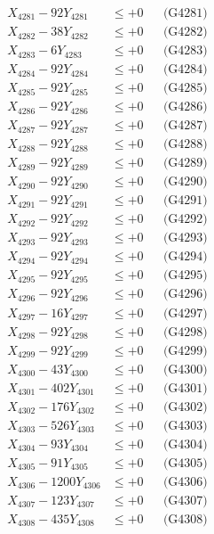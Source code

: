 \documentclass[a4paper,10pt]{article}
\begin{document}
{\begin{align}
X_{4281} - 92Y_{4281} &\leq +0 && \text{(G4281)} \\
X_{4282} - 38Y_{4282} &\leq +0 && \text{(G4282)} \\
X_{4283} - 6Y_{4283} &\leq +0 && \text{(G4283)} \\
X_{4284} - 92Y_{4284} &\leq +0 && \text{(G4284)} \\
X_{4285} - 92Y_{4285} &\leq +0 && \text{(G4285)} \\
X_{4286} - 92Y_{4286} &\leq +0 && \text{(G4286)} \\
X_{4287} - 92Y_{4287} &\leq +0 && \text{(G4287)} \\
X_{4288} - 92Y_{4288} &\leq +0 && \text{(G4288)} \\
X_{4289} - 92Y_{4289} &\leq +0 && \text{(G4289)} \\
X_{4290} - 92Y_{4290} &\leq +0 && \text{(G4290)} \\
\allowbreak
X_{4291} - 92Y_{4291} &\leq +0 && \text{(G4291)} \\
X_{4292} - 92Y_{4292} &\leq +0 && \text{(G4292)} \\
X_{4293} - 92Y_{4293} &\leq +0 && \text{(G4293)} \\
X_{4294} - 92Y_{4294} &\leq +0 && \text{(G4294)} \\
X_{4295} - 92Y_{4295} &\leq +0 && \text{(G4295)} \\
X_{4296} - 92Y_{4296} &\leq +0 && \text{(G4296)} \\
X_{4297} - 16Y_{4297} &\leq +0 && \text{(G4297)} \\
X_{4298} - 92Y_{4298} &\leq +0 && \text{(G4298)} \\
X_{4299} - 92Y_{4299} &\leq +0 && \text{(G4299)} \\
X_{4300} - 43Y_{4300} &\leq +0 && \text{(G4300)} \\
\allowbreak
X_{4301} - 402Y_{4301} &\leq +0 && \text{(G4301)} \\
X_{4302} - 176Y_{4302} &\leq +0 && \text{(G4302)} \\
X_{4303} - 526Y_{4303} &\leq +0 && \text{(G4303)} \\
X_{4304} - 93Y_{4304} &\leq +0 && \text{(G4304)} \\
X_{4305} - 91Y_{4305} &\leq +0 && \text{(G4305)} \\
X_{4306} - 1200Y_{4306} &\leq +0 && \text{(G4306)} \\
X_{4307} - 123Y_{4307} &\leq +0 && \text{(G4307)} \\
X_{4308} - 435Y_{4308} &\leq +0 && \text{(G4308)} \\

\end{align}}
\end{document}
